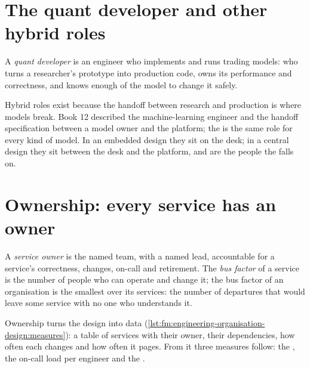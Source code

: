 \section{The quant developer and other hybrid roles}

\begin{definition}\label{def:fm:engineering-organisation-design:qd}
A \emph{quant developer} is an engineer who implements and runs trading models: who turns a researcher's prototype into
production code, owns its performance and correctness, and knows enough of the model to change it safely.
\end{definition}

Hybrid roles exist because the handoff between research and production is where models break. Book 12 described the machine-learning engineer
and the handoff specification between a model owner and the platform; the  is the same role for every kind of model. In an embedded
design they sit on the desk; in a central design they sit between the desk and the platform, and are the people the  falls on.

\section{Ownership: every service has an owner}

\begin{definition}\label{def:fm:engineering-organisation-design:owner}
A \emph{service owner} is the named team, with a named lead, accountable for a service's correctness, changes, on-call and
retirement. The \emph{bus factor} of a service is the number of people who can operate and change it; the bus factor of an
organisation is the smallest over its services: the number of departures that would leave some service with no one who understands it.
\end{definition}

Ownership turns the design into data (\cref{lst:fm:engineering-organisation-design:measures}): a table of services with their owner, their
dependencies, how often each changes and how often it pages. From it three measures follow: the , the on-call load per engineer
and the .

